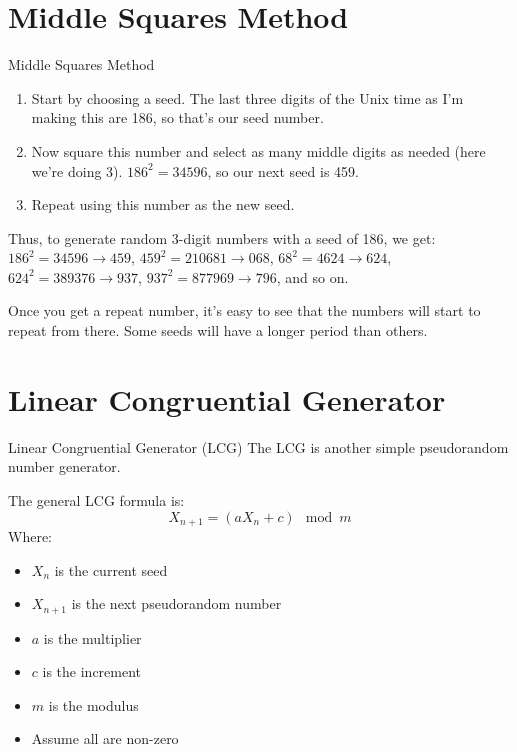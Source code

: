 \documentclass[aspectratio=169]{beamer}
\begin{document}
\section{Middle Squares Method}
\begin{frame}{Middle Squares Method}
\begin{enumerate}
    \item Start by choosing a seed. The last three digits of the Unix time as I'm making this are 186, so that's our seed number. \pause
    \item Now square this number and select as many middle digits as needed (here we're doing 3). $186^2 = 34596$, so our next seed is 459. \pause 
    \item Repeat using this number as the new seed. \pause
\end{enumerate}
Thus, to generate random 3-digit numbers with a seed of 186, we get:
$186^2 = 34596 \rightarrow 459$, $459^2 = 210681 \rightarrow 068$, $68^2 = 4624 \rightarrow 624$, $624^2 = 389376 \rightarrow 937$, $937^2 = 877969 \rightarrow 796$, and so on. \pause

Once you get a repeat number, it's easy to see that the numbers will start to repeat from there. Some seeds will have a longer period than others.


\end{frame}
\section{Linear Congruential Generator}
\begin{frame}{Linear Congruential Generator (LCG)}
The LCG is another simple pseudorandom number generator.

The general LCG formula is:
\[X_{n+1} = (a X_n + c)\mod m\] \pause
Where:
\begin{itemize}
    \item \(X_n\) is the current seed
    \item \(X_{n+1}\) is the next pseudorandom number
    \item \(a\) is the multiplier
    \item \(c\) is the increment
    \item \(m\) is the modulus
    \item Assume all are non-zero
\end{itemize}
\end{frame}
\end{document}
